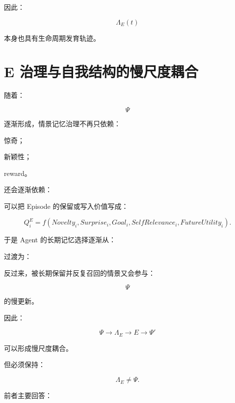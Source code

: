 因此：

\[
\boxed{
\Lambda_E(t)
}
\]

本身也具有生命周期发育轨迹。


\section{E 治理与自我结构的慢尺度耦合}

随着：

\[
\Psi
\]

逐渐形成，情景记忆治理不再只依赖：

惊奇；

新颖性；

reward。

还会逐渐依赖：

\begin{statementbox}
\centering
{}
\end{statementbox}

可以把 Episode 的保留或写入价值写成：

\[
Q_i^E
=
f(
Novelty_i,
Surprise_i,
Goal_i,
SelfRelevance_i,
FutureUtility_i
).
\]

于是 Agent 的长期记忆选择逐渐从：

\begin{statementbox}
\centering
{}
\end{statementbox}

过渡为：

\begin{statementbox}
\centering
{}
\end{statementbox}

反过来，被长期保留并反复召回的情景又会参与：

\[
\Psi
\]

的慢更新。

因此：

\[
\boxed{
\Psi
\rightarrow
\Lambda_E
\rightarrow
E
\rightarrow
\Psi'
}
\]

可以形成慢尺度耦合。

但必须保持：

\[
\boxed{
\Lambda_E\neq\Psi.
}
\]

前者主要回答：

\begin{statementbox}
\centering
{}
\end{statementbox}

